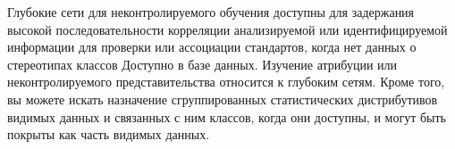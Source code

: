 \begin{frame}

    Глубокие сети для неконтролируемого обучения доступны для задержания высокой последовательности корреляции анализируемой или идентифицируемой информации для проверки или ассоциации стандартов,
    когда нет данных о стереотипах классов Доступно в базе данных.
    Изучение атрибуции или неконтролируемого представительства относится к глубоким сетям. Кроме того,
    вы можете искать назначение сгруппированных статистических дистрибутивов видимых данных и связанных с ним классов,
    когда они доступны, и могут быть покрыты как часть видимых данных.

\end{frame}